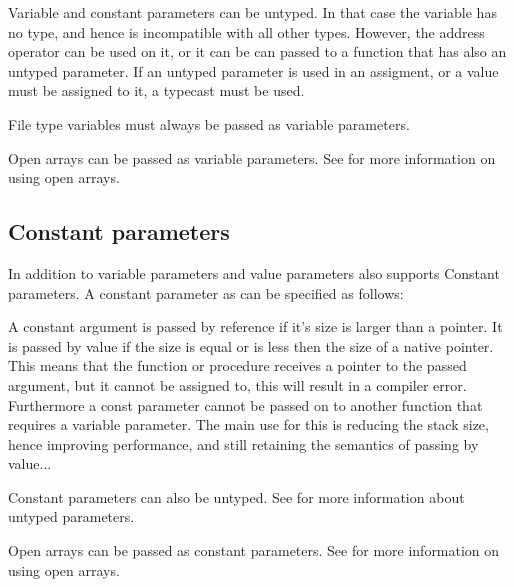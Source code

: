 Variable and constant parameters can be untyped. In that case the variable has no type,
and hence is incompatible with all other types. However, the address operator
can be used on it, or it can be can passed to a function that has also an
untyped parameter. If an untyped parameter is used in an assigment,
or a value must be assigned to it, a typecast must be used.

File type variables must always be passed as variable parameters.

Open arrays can be passed as variable parameters. See  for
more information on using open arrays.
\subsection{Constant parameters}
In addition to variable parameters and value parameters \fpc also supports
Constant parameters. A constant parameter as can be specified as follows:

A constant argument is passed by reference if it's size is larger than a
pointer. It is passed by value if the size is equal or is less then the 
size of a native pointer.
This means that the function or procedure receives a pointer to the passed
argument, but it cannot be assigned to, this will result in a
compiler error. Furthermore a const parameter cannot be passed on to another
function that requires a variable parameter.
The main use for this is reducing the stack size, hence improving
performance, and still retaining the semantics of passing by value...

Constant parameters can also be untyped. See  for more
information about untyped parameters.

Open arrays can be passed as constant parameters. See  for
more information on using open arrays.
